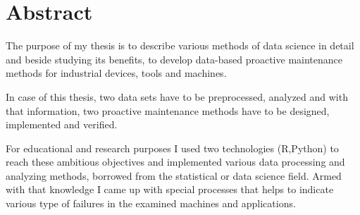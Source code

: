 \chapter*{Abstract}

The purpose of my thesis is to describe various methods of data science in detail and beside studying its benefits, to develop data-based proactive maintenance methods for industrial devices, tools and machines.

In case of this thesis, two data sets have to be preprocessed, analyzed and with that information, two proactive maintenance methods have to be designed, implemented and verified.

For educational and research purposes I used two technologies (R,Python) to reach these ambitious objectives and implemented various data processing and analyzing methods, borrowed from the statistical or data science field. Armed with that knowledge I came up with special processes that helps to indicate various type of failures in the examined machines and applications.
